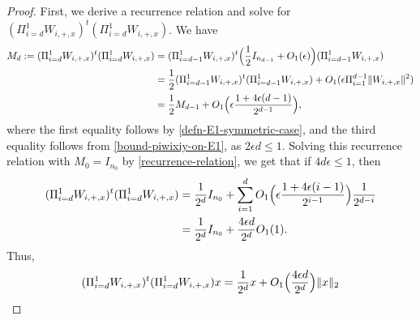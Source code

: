 \documentclass[11pt]{article}
\newcommand{\eps}{\epsilon}
\newcommand{\PiWd}{\Pi_{i=d}^1 W_{i,+,x}}
\newcommand{\PiWn}[1]{\Pi_{i={#1}}^1 W_{i,+,x}}
\newcommand{\Wipx}{W_{i, +, x}}
\begin{document}
\begin{proof}
First, we derive a recurrence relation and solve for $(\PiWd)^t (\PiWd)$.  We have
\begin{align*}
M_d:=  (\PiWd)^t (\PiWd) 
&= (\PiWn{d-1})^t \Bigl(\frac{1}{2}I_{n_{d-1}} + O_1(\eps) \Bigr)  (\PiWn{d-1}) \\
&= \frac{1}{2} (\PiWn{d-1})^t (\PiWn{d-1})  + O_1(\eps \Pi_{i=1}^{d-1} \| \Wipx\|^2) \\
&= \frac{1}{2} M_{d-1} + O_1 \Bigl(\eps \frac{1 + 4 \eps (d-1)}{2^{d-1}} \Bigr),
\end{align*}
where the first equality follows by \eqref{defn-E1-symmetric-case}, and the third equality follows from \eqref{bound-piwixiy-on-E1}, as $2 \eps d \leq 1$.
Solving this recurrence relation with $M_0 = I_{n_0}$ by \eqref{recurrence-relation}, we get that if $4 d \eps \leq 1$, then 
\begin{align}
(\PiWd)^t (\PiWd)  &= \frac{1}{2^d} I_{n_0} + \sum_{i=1}^d O_1\Bigl(\eps \frac{1 + 4 \eps (i-1)}{2^{i-1}} \Bigr) \frac{1}{2^{d-i}} \notag \\
&= \frac{1}{2^d}I_{n_0} + \frac{4 \eps d}{2^d}  O_1(1).  \label{error-bound-md}
\end{align}
Thus, 
\begin{align}
( \PiWd)^t ( \PiWd ) x = \frac{1}{2^d} x + O_1\Bigl( \frac{4 \eps d}{2^d} \Bigr) \|x\|_2 \label{vxy-first-term-d-layer-estimate}
\end{align}


\end{proof}
\end{document}
